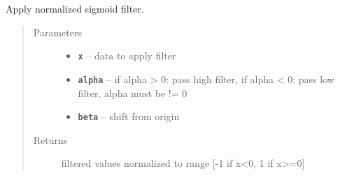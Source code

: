 \documentclass[letterpaper,10pt,english]{sphinxmanual}
\begin{document}

\begin{fulllineitems}
\label{RRtoolbox.lib.arrayops:RRtoolbox.lib.arrayops.filters.normsigmoid}
Apply normalized sigmoid filter.
\begin{quote}\begin{description}
\item[{Parameters}] \leavevmode\begin{itemize}
\item {} 
\textbf{\texttt{x}} -- data to apply filter

\item {} 
\textbf{\texttt{alpha}} -- if alpha \textgreater{} 0: pass high filter, if alpha \textless{} 0: pass low filter, alpha must be != 0

\item {} 
\textbf{\texttt{beta}} -- shift from origin

\end{itemize}

\item[{Returns}] \leavevmode
filtered values normalized to range {[}-1 if x\textless{}0, 1 if x\textgreater{}=0{]}

\end{description}\end{quote}

\end{fulllineitems}

\end{document}

